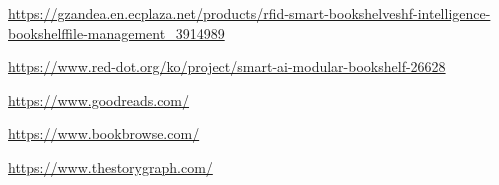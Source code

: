 \documentclass[conference]{IEEEtran}
\begin{document}
\begin{thebibliography}{00}
\url{https://gzandea.en.ecplaza.net/products/rfid-smart-bookshelveshf-intelligence-bookshelffile-management_3914989}

\url{https://www.red-dot.org/ko/project/smart-ai-modular-bookshelf-26628}

\url{https://www.goodreads.com/}

\url{https://www.bookbrowse.com/}

\url{https://www.thestorygraph.com/}

\end{thebibliography}
\end{document}
